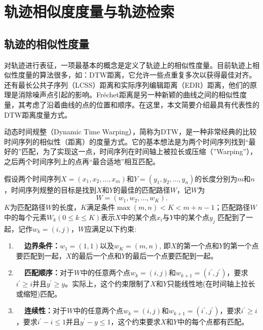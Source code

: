 \section{轨迹相似度度量与轨迹检索}

\subsection{轨迹的相似性度量}
对轨迹进行表征，一项最基本的概念是定义了轨迹上的相似性度量。目前轨迹上相似性度量的算法很多，如：DTW距离，它允许一些点重复多次以获得最佳对齐。还有最长公共子序列（LCSS）距离和实际序列编辑距离（EDR）距离，他们的原理是消除噪声点引起的影响。Fr\'echet距离是另一种新颖的曲线之间的相似性度量，其考虑了沿着曲线的点的位置和顺序。在这里，本文简要介绍最具有代表性的DTW距离度量方式。

动态时间规整（Dynamic Time Warping），简称为DTW，是一种非常经典的比较时间序列的相似性（距离）的度量方式。它的基本想法是为两个时间序列找到“最好的”匹配，为了实现这一点，时间序列在时间轴上被拉长或压缩（”Warping”），之后两个时间序列上的点再“最合适地”相互匹配。

假设两个时间序列$X = \left( x _ { 1 } , x _ { 2 } , \ldots , x _ { m } \right)$和$Y = \left( y _ { 1 } , y _ { 2 } , \ldots , y _ { n } \right)$的长度分别为$m$和$n$，时间序列规整的目标是找到$X$和$Y$的最佳的匹配路径$W$，记$W$为
\begin{equation}
W = \left( w _ { 1 } , w _ { 2 } , \ldots , w _ { K } \right).
\end{equation}
$K$为匹配路径$W$的长度，$K$满足条件$\max ( m , n ) < K < m + n - 1$；匹配路径$W$中的每个元素$W _ { k } ( 0 \leq k \leq K )$表示$X$中的某个点$x_i$与$Y$中的某个点$y_j$ 匹配到了一起，记作$w _ { k } = ( i , j )$，$W$应满足以下约束:

\begin{enumerate}
    \item \textbf{~~边界条件：}$w_1 = ( 1,1 )$以及$w _ { K } = ( m , n )$, 即$X$的第一个点和$Y$的第一个点要匹配到一起，$X$的最后一个点和$Y$的最后一个点要匹配到一起。
    \item \textbf{~~匹配顺序：}对于$W$中的任意两个点$w _ { k } = ( i , j )$和$w _ { k + 1 } = \left( i ^ { \prime } , j ^ { \prime } \right)$，要求$i ^ { \prime } \geq i$并且$y ^ { \prime } \geq y$。实际上，这个约束限制了$X$和$Y$只能线性地(在时间轴上拉长或缩短)匹配。
    \item \textbf{~~连续性：}对于$W$中的任意两个点$w _ { k } = ( i , j )$和$w _ { k + 1 } = \left( i ^ { \prime } , j ^ { \prime } \right)$，要求$i ^ { \prime } \geq i$，要求$i ^ { \prime } - i \leq 1$并且$y ^ { \prime } - y \leq 1$，这个约束要求$X$和$Y$中的每个点都有匹配。
\end{enumerate}

